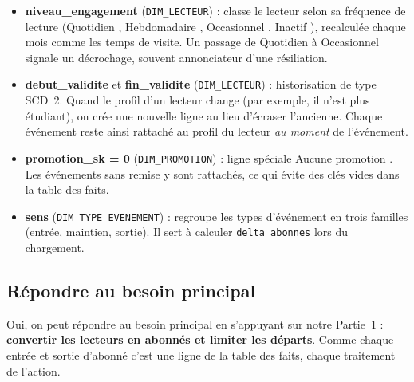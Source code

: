 \documentclass[a4paper,12pt]{article}
\begin{document}
\begin{itemize}
  \item \textbf{niveau\_engagement} (\texttt{DIM\_LECTEUR}) : classe le lecteur
  selon sa fréquence de lecture (\og Quotidien \fg, \og Hebdomadaire \fg,
  \og Occasionnel \fg, \og Inactif \fg), recalculée chaque mois comme les
  temps de visite. Un passage de \og Quotidien \fg{} à \og Occasionnel \fg{}
  signale un décrochage, souvent annonciateur d'une résiliation.

  \item \textbf{debut\_validite} et \textbf{fin\_validite}
  (\texttt{DIM\_LECTEUR}) : historisation de type SCD~2. Quand le profil d'un
  lecteur change (par exemple, il n'est plus étudiant), on crée une nouvelle
  ligne au lieu d'écraser l'ancienne. Chaque événement reste ainsi rattaché
  au profil du lecteur \emph{au moment} de l'événement.

  \item \textbf{promotion\_sk = 0} (\texttt{DIM\_PROMOTION}) : ligne spéciale
  \og Aucune promotion \fg. Les événements sans remise y sont rattachés,
  ce qui évite des clés vides dans la table des faits.

  \item \textbf{sens} (\texttt{DIM\_TYPE\_EVENEMENT}) : regroupe les types
  d'événement en trois familles (entrée, maintien, sortie). Il sert à
  calculer \texttt{delta\_abonnes} lors du chargement.

\end{itemize}

\subsection{Répondre au besoin principal}

Oui, on peut répondre au besoin principal en s'appuyant sur notre Partie~1 : \textbf{convertir les lecteurs en abonnés et limiter les départs}. Comme chaque entrée et sortie d'abonné c'est une ligne de la table des faits, chaque traitement de l'action.
\end{document}
